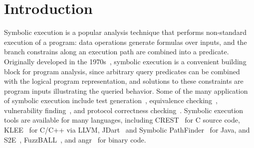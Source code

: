 \section{Introduction}

Symbolic execution is a popular analysis technique that performs non-standard execution of a program: data operations generate formulas over inputs, and the branch constrains along an execution path are combined into a predicate.
%
Originally developed in the 1970s~\cite{King1976,Clarke1976}, symbolic execution is a convenient building block for program analysis, since arbitrary query predicates can be combined with the logical program representation, and solutions to these constraints are program inputs illustrating the queried behavior.
%
Some of the many application of symbolic execution include
test generation~\cite{dart,cute}, equivalence checking~\cite{ramos,adaptorsynth}, vulnerability finding~\cite{driller,angr}, and protocol correctness checking~\cite{transport}.
%
Symbolic execution tools are available for many languages, including
CREST~\cite{BurnimS2008} for C source code, KLEE~\cite{CadarDE2008}
for C/C++ via LLVM, JDart~\cite{jdart2016} and Symbolic
PathFinder~\cite{spf} for Java, and S2E~\cite{ChipounovKC2012},
FuzzBALL~\cite{BabicMMS2011}, and angr~\cite{angr} for binary code.
%

